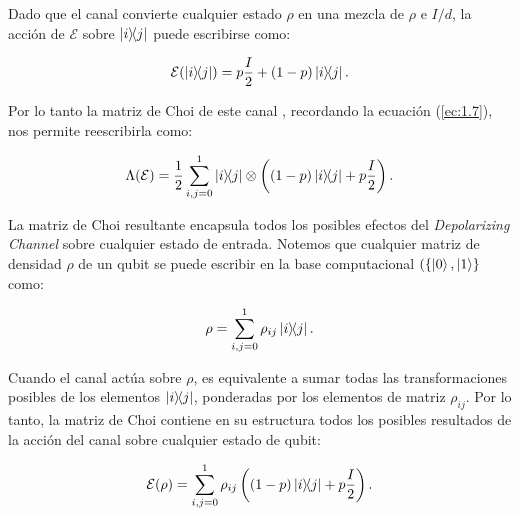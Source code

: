 \documentclass[11pt, spanish, letterpage]{report} %
\newcommand{\1}{\mathbb{1}}
\begin{document}
Dado que el canal  convierte cualquier estado $\rho$ en una mezcla de $\rho$ e $I/d$, la acción de $\mathcal{E}$ sobre $\ketbra{i}{j}$ puede escribirse como:

\begin{equation}
\mathcal{E}(\ketbra{i}{j}) = p \frac{I}{2}+ (1 - p) \ketbra{i}{j}.
\end{equation}

Por lo tanto la matriz de  Choi de este canal , recordando la ecuación (\ref{ec:1.7}), nos permite reescribirla  como:


\begin{equation}
\Lambda(\mathcal{E}) = \frac{1}{2} \sum_{i,j=0}^{1} \ketbra{i}{j} \otimes \left( (1-p) \ketbra{i}{j} + p \frac{I}{2} \right).
\end{equation}

La matriz de Choi resultante encapsula todos los posibles efectos del \textit{Depolarizing Channel} sobre cualquier estado de entrada. 
Notemos que cualquier matriz de densidad $\rho$ de un qubit se puede escribir en la base computacional $(\{\ket{0}, \ket{1} \}$ como:

\begin{equation}
\rho = \sum_{i,j=0}^{1} \rho_{ij}\ketbra{i}{j}.
\end{equation}

Cuando el canal actúa sobre $\rho$, es equivalente a sumar todas las transformaciones posibles de los elementos $\ketbra{i}{j}$, ponderadas por los elementos de matriz $\rho_{ij}$. Por lo tanto, la matriz de Choi contiene en su estructura todos los posibles resultados de la acción del canal sobre cualquier estado de qubit:

\begin{equation}
\mathcal{E}(\rho) = \sum_{i,j=0}^{1} \rho_{ij} \left( (1-p) \ketbra{i}{j} + p \frac{I}{2} \right).
\end{equation}







\end{document}
